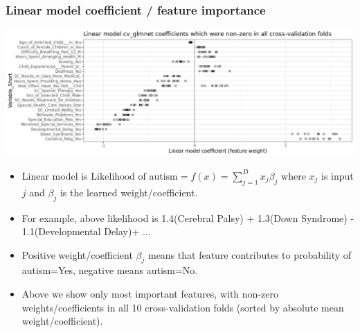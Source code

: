 \documentclass{beamer}
\begin{document}
\begin{frame}
  \frametitle{Linear model coefficient / feature importance}
  \includegraphics[width=\textwidth]{download-nsch-mlr3batchmark-registry-glmnet-coef-all.png}

  \begin{itemize}
  \item Linear model is
    $\text{Likelihood of autism} = f(x) = \sum_{j=1}^D x_j \beta_j$
    where $x_j$ is input $j$ and $\beta_j$ is the learned weight/coefficient.
  \item For example, above likelihood is 1.4(Cerebral Palsy) + 1.3(Down Syndrome) - 1.1(Developmental Delay)+ ...
  \item Positive weight/coefficient $\beta_j$ means that feature
    contributes to probability of autism=Yes, negative means
    autism=No.
  \item Above we show only most important features, with non-zero
    weights/coefficients in all 10 cross-validation folds (sorted by
    absolute mean weight/coefficient).
  \end{itemize}

\end{frame}
\end{document}
